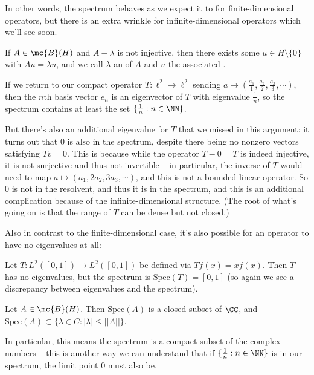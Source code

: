 In other words, the spectrum behaves as we expect it to for finite-dimensional operators, but there is an extra wrinkle for infinite-dimensional operators which we'll see soon.

\begin{definition}
If $A \in \mc{B}(H)$ and $A - \lambda$ is not injective, then there exists some $u \in H \setminus \{0\}$ with $Au = \lambda u$, and we call $\lambda$ an  of $A$ and $u$ the associated .
\end{definition}

\begin{example}
If we return to our compact operator $T: \ell^2 \to \ell^2$ sending $a \mapsto (\frac{a_1}{1}, \frac{a_2}{2}, \frac{a_3}{3}, \cdots)$, then the $n$th basis vector $e_n$ is an eigenvector of $T$ with eigenvalue $\frac{1}{n}$, so the spectrum contains at least the set $\{\frac{1}{n}: n \in \NN\}$.
\end{example}

But there's also an additional eigenvalue for $T$ that we missed in this argument: it turns out that $0$ is also in the spectrum, despite there being no nonzero vectors satisfying $Tv = 0$. This is because while the operator $T -0 = T$ is indeed injective, it is not surjective and thus not invertible -- in particular, the inverse of $T$ would need to map $a \mapsto (a_1, 2a_2, 3a_3, \cdots)$, and this is not a bounded linear operator. So $0$ is not in the resolvent, and thus it is in the spectrum, and this is an additional complication because of the infinite-dimensional structure. (The root of what's going on is that the range of $T$ can be dense but not closed.)
 
Also in contrast to the finite-dimensional case, it's also possible for an operator to have no eigenvalues at all:

\begin{example}
Let $T: L^2([0, 1]) \to L^2([0, 1])$ be defined via $Tf(x) = xf(x)$. Then $T$ has no eigenvalues, but the spectrum is $\text{Spec}(T) = [0, 1]$ (so again we see a discrepancy between eigenvalues and the spectrum). 
\end{example}

\begin{theorem}
Let $A \in \mc{B}(H)$. Then $\text{Spec}(A)$ is a closed subset of $\CC$, and $\text{Spec}(A) \subset \{\lambda \in C: |\lambda| \le ||A||\}$.
\end{theorem}

In particular, this means the spectrum is a compact subset of the complex numbers -- this is another way we can understand that if $\{\frac{1}{n}: n \in \NN\}$ is in our spectrum, the limit point $0$ must also be.

